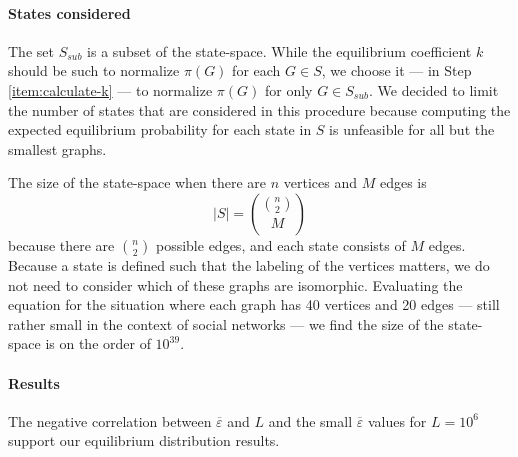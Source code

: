 \documentclass[a4paper,10pt]{article}
\begin{document}
\paragraph{States considered} The set $S_{sub}$ is a subset of the state-space. While the equilibrium coefficient $k$ should be such to normalize $\pi(G)$ for each $G \in S$, we choose it --- in Step \ref{item:calculate-k} --- to normalize $\pi(G)$ for only $G \in S_{sub}$. We decided to limit the number of states that are considered in this procedure because computing the expected equilibrium probability for each state in $S$ is unfeasible for all but the smallest graphs. 

The size of the state-space when there are $n$ vertices and $M$ edges is
\begin{equation}
 |S| = {{n \choose 2} \choose M}
\end{equation}
because there are $n \choose 2$ possible edges, and each state consists of $M$ edges. Because a state is defined such that the labeling of the vertices matters, we do not need to consider which of these graphs are isomorphic. Evaluating the equation for the situation where each graph has 40 vertices and 20 edges --- still rather small in the context of social networks --- we find the size of the state-space is on the order of $10^{39}$.  

\paragraph{Results} The negative correlation between $\overline\varepsilon$ and $L$ and the small $\overline\varepsilon$ values for $L = 10^6$ support our equilibrium distribution results.

\begin{table}[H]
\centering
{}
\qquad
{}
\caption{The results of several executions of the procedure on states with 4 vertices and 2 edges. An arbitrarily chosen $I$-value of $0.5$ was used.}
\end{table}
\end{document}
